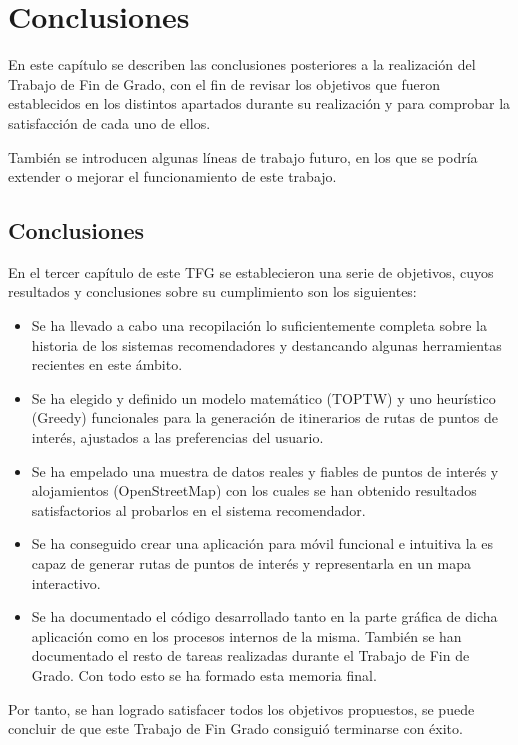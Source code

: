 \chapter{Conclusiones}

En este capítulo se describen las conclusiones posteriores a la realización del Trabajo de Fin de Grado, con el fin de revisar los objetivos que fueron establecidos en los distintos apartados durante su realización y para comprobar la satisfacción de cada uno de ellos.\newline

También se introducen algunas líneas de trabajo futuro, en los que se podría extender o mejorar el funcionamiento de este trabajo.\newline

\section[Conclusiones]{Conclusiones}
En el tercer capítulo de este TFG se establecieron una serie de objetivos, cuyos resultados y conclusiones sobre su cumplimiento son los siguientes:
\begin{itemize}
	\item Se ha llevado a cabo una recopilación lo suficientemente completa sobre la historia de los sistemas recomendadores y destancando algunas herramientas recientes en este ámbito.
	\item Se ha elegido y definido un modelo matemático (TOPTW) y uno heurístico (Greedy) funcionales para la generación de itinerarios de rutas de puntos de interés, ajustados a las preferencias del usuario.
	\item Se ha empelado una muestra de datos reales y fiables de puntos de interés y alojamientos (OpenStreetMap) con los cuales se han obtenido resultados satisfactorios al probarlos en el sistema recomendador.
	\item Se ha conseguido crear una aplicación para móvil funcional e intuitiva la es capaz de generar rutas de puntos de interés y representarla en un mapa interactivo.
	\item Se ha documentado el código desarrollado tanto en la parte gráfica de dicha aplicación como en los procesos internos de la misma. También se han documentado el resto de tareas realizadas durante el Trabajo de Fin de Grado. Con todo esto se ha formado esta memoria final.
\end{itemize}

Por tanto, se han logrado satisfacer todos los objetivos propuestos, se puede concluir de que este Trabajo de Fin Grado consiguió terminarse con éxito.\newline

